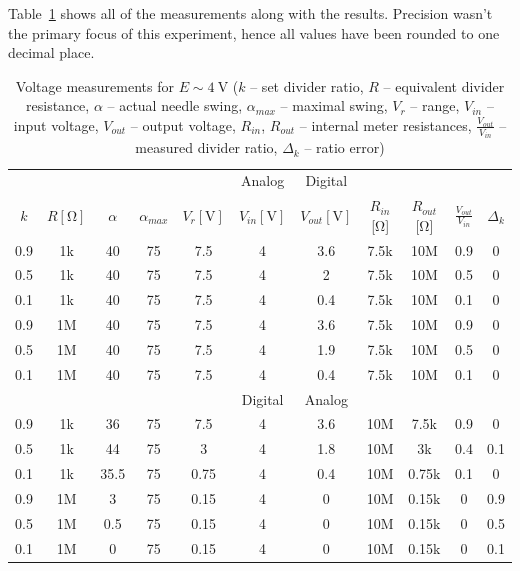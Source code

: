 Table~\ref{tab:voltage_divider} shows all of the measurements along with the results. Precision wasn't the primary focus of this experiment, hence all values have been rounded to one decimal place.

\begin{table}[H]
	\centering
	\begin{tabular}{|c c  c  c  c  c  c  c c  c  c|}
		\hline
		\multicolumn{5}{|c}{\multirow{2}{*}{}} & \multirow{2}{*}{Analog} & \multirow{2}{*}{Digital} & \multicolumn{4}{c|}{ \multirow{2}{*}{ }}\\
		&&&&&&&&&&\\
		\hline
		$k$ &	$R [\unit{\ohm}]$ & 	$\alpha$ & $\alpha_{max}$ &	$V_r [\unit{\volt}]$ & $V_{in} [\unit{\volt}]$ &	$V_{out} [\unit{\volt}]$ & $R_{in}$ [\unit{\ohm}]& $R_{out}$ [\unit{\ohm}]&  $	\frac{V_{out}}{V_{in}}$ & $\Delta_k$\\
		\hline
		0.9	& 1k	& 40 & 75 &	7.5	& 4	& 3.6 &	7.5k &	10M&	0.9	& 0\\
		\hline
		0.5	& 1k	& 40 &	75	& 7.5 &	4 &	2	& 7.5k	& 10M	& 0.5	& 0\\
		\hline
		0.1	& 1k &	40 & 75	& 7.5	& 4 &	0.4&	7.5k &	10M&	0.1 &	0\\
		\hline
		0.9 &	1M &	40 &	75	& 7.5 &	4	& 3.6	& 7.5k&	10M	& 0.9 &	0\\
		\hline
		0.5	& 1M	& 40	& 75 &	7.5 &	4	& 1.9	& 7.5k &	10M &	0.5	& 0\\
		\hline
		0.1	& 1M	& 40	& 75	& 7.5 &4	&0.4 &	7.5k &	10M	& 0.1 &	0\\
		\hline
		\multicolumn{5}{|c}{\multirow{2}{*}{}} & \multirow{2}{*}{Digital} & \multirow{2}{*}{Analog} & \multicolumn{4}{c|}{ \multirow{2}{*}{ }}\\
		&&&&&&&&&&\\
		\hline
		0.9	& 1k & 36 &	75 &	7.5 &	4 & 3.6 &	10M & 	7.5k & 0.9	& 0\\
		\hline
		0.5	& 1k &	44 & 75 & 3	& 4	& 1.8	& 10M &	3k & 0.4 & 0.1\\
		\hline
		0.1	& 1k & 35.5 & 75 & 0.75 & 4 &	0.4 & 	10M &	0.75k &	0.1	& 0\\
		\hline
		0.9	& 1M &	3	& 75	& 0.15	& 4 &	0 &	10M &	0.15k &	0 &	0.9\\
		\hline
		0.5	& 1M & 0.5	& 75	& 0.15 &	4 &	0 &	10M &	0.15k &	0&	0.5\\
		\hline
		0.1 &	1M &	0	& 75 &	0.15 &	4 &	0 &	10M &	0.15k &	0 &	0.1\\
		\hline
	\end{tabular}
	\caption{Voltage measurements for $E\sim\SI{4}{\volt}$ ($k$ -- set divider ratio, $R$ --  equivalent divider resistance, $\alpha$ -- actual needle swing, $\alpha_{max}$ -- maximal swing, $V_r$ -- range, $V_{in}$ -- input voltage, $V_{out}$ -- output voltage, $R_{in}$, $R_{out}$ -- internal meter resistances, $\frac{V_{out}}{V_{in}}$ -- measured divider ratio, $\Delta_k$ -- ratio error)}
	\label{tab:voltage_divider}
\end{table}

